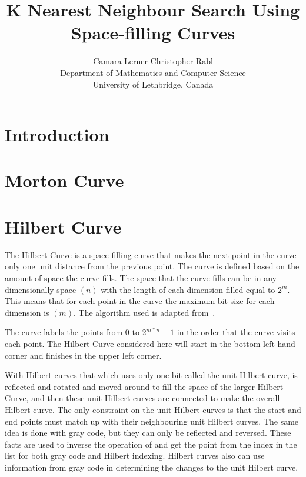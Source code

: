 \documentclass[10pt]{article}
\begin{document}
\title{K Nearest Neighbour Search Using Space-filling Curves}
\author{Camara Lerner \hspace{2cm} Christopher Rabl \\
  Department of Mathematics and Computer Science \\
  University of Lethbridge, Canada}

\maketitle

\section{Introduction}

\section{Morton Curve}

\section{Hilbert Curve}

The Hilbert Curve is a space filling curve that makes the next point in the curve only one unit distance from the previous point. The curve is defined based on the amount of space the curve fills. The space that the curve fills can be in any dimensionally space $(n)$ with the length of each dimension filled equal to $2^m$. This means that for each point in the curve the maximum bit size for each dimension is $(m)$. The algorithm used is adapted from~\cite{Hamilton:2006}. 

The curve labels the points from $0$ to $2^{m*n} - 1$ in the order that the curve visits each point. The Hilbert Curve considered here will start in the bottom left hand corner and finishes in the upper left corner. 

With Hilbert curves that which uses only one bit called the unit Hilbert curve, is reflected and rotated and moved around to fill the space of the larger Hilbert Curve, and then these unit Hilbert curves are connected to make the overall Hilbert curve. The only constraint on the unit Hilbert curves is that the start and end points must match up with their neighbouring unit Hilbert curves. The same idea is done with gray code, but they  can only be reflected and reversed. These facts are used to inverse the operation of and get the point from the index in the list for both gray code and Hilbert indexing. Hilbert curves also can use information from gray code in determining the changes to the unit Hilbert curve.
 
\end{document}
